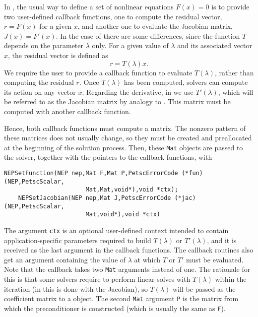 In , the usual way to define a set of nonlinear equations $F(x)=0$ is to provide two user-defined callback functions, one to compute the residual vector, $r=F(x)$ for a given $x$, and another one to evaluate the Jacobian matrix, $J(x)=F'(x)$.
In the case of  there are some differences, since the function $T$ depends on the parameter $\lambda$ only. For a given value of $\lambda$ and its associated vector $x$, the residual vector is defined as
\begin{equation}
r=T(\lambda)x.\label{eq:nlres}
\end{equation}
We require the user to provide a callback function to evaluate $T(\lambda)$, rather than computing the residual $r$. Once $T(\lambda)$ has been computed,  solvers can compute its action on any vector $x$. Regarding the derivative, in  we use $T'(\lambda)$, which will be referred to as the Jacobian matrix by analogy to . This matrix must be computed with another callback function.

Hence, both callback functions must compute a matrix. The nonzero pattern of these matrices does not usually change, so they must be created and preallocated at the beginning of the solution process. Then, these \texttt{Mat} objects are passed to the solver, together with the pointers to the callback functions, with
	\begin{Verbatim}[fontsize=\small]
	NEPSetFunction(NEP nep,Mat F,Mat P,PetscErrorCode (*fun)(NEP,PetscScalar,
                       Mat,Mat,void*),void *ctx);
	NEPSetJacobian(NEP nep,Mat J,PetscErrorCode (*jac)(NEP,PetscScalar,
                       Mat,void*),void *ctx)
	\end{Verbatim}

The argument \texttt{ctx} is an optional user-defined context intended to contain application-specific parameters required to build $T(\lambda)$ or $T'(\lambda)$, and it is received as the last argument in the callback functions. The callback routines also get an argument containing the value of $\lambda$ at which $T$ or $T'$ must be evaluated. Note that the  callback takes two \texttt{Mat} arguments instead of one. The rationale for this is that some  solvers require to perform linear solves with $T(\lambda)$ within the iteration (in  this is done with the Jacobian), so $T(\lambda)$ will be passed as the coefficient matrix to a  object. The second \texttt{Mat} argument \texttt{P} is the matrix from which the preconditioner is constructed (which is usually the same as \texttt{F}).

